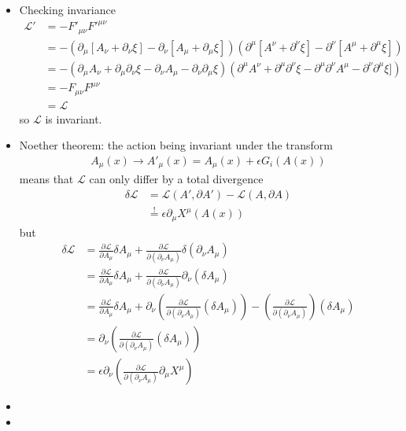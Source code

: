 \documentclass[../main.tex]{subfiles}
\begin{document}
\begin{itemize}
\item Checking invariance
\begin{align}
\mathcal{L}'&=-F'_{\mu\nu}F'^{\mu\nu}\\
&=-(\partial_\mu[A_\nu+\partial_\nu\xi]-\partial_\nu[A_\mu+\partial_\mu\xi])(\partial^\mu[A^\nu+\partial^\nu\xi]-\partial^\nu[A^\mu+\partial^\mu\xi])\\
&=-(\partial_\mu A_\nu+\partial_\mu\partial_\nu\xi-\partial_\nu A_\mu-\partial_\nu\partial_\mu\xi)
(\partial^\mu A^\nu+\partial^\mu\partial^\nu\xi-\partial^\mu\partial^\nu A^\mu-\partial^\nu\partial^\mu\xi])\\
&=-F_{\mu\nu}F^{\mu\nu}\\
&=\mathcal{L}
\end{align}
so $\mathcal{L}$ is invariant.
\item Noether theorem: the action being invariant under the transform
\begin{align}
A_\mu(x)\rightarrow A'_\mu(x)=A_\mu(x)+\epsilon G_i(A(x))
\end{align}
means that $\mathcal{L}$ can only differ by a total divergence
\begin{align}
\delta\mathcal{L}
&=\mathcal{L}(A',\partial A')-\mathcal{L}(A,\partial A)\\
&\overset{!}{=}\epsilon\partial_\mu X^\mu(A(x))
\end{align}
but
\begin{align}
\delta\mathcal{L}
&=\frac{\partial\mathcal{L}}{\partial A_\mu}\delta A_\mu+\frac{\partial\mathcal{L}}{\partial (\partial_\nu A_\mu)}\delta (\partial_\nu A_\mu)\\
&=\frac{\partial\mathcal{L}}{\partial A_\mu}\delta A_\mu+\frac{\partial\mathcal{L}}{\partial (\partial_\nu A_\mu)} \partial_\nu (\delta A_\mu)\\
&=\frac{\partial\mathcal{L}}{\partial A_\mu}\delta A_\mu+\partial_\nu
\left(\frac{\partial\mathcal{L}}{\partial (\partial_\nu A_\mu)}  (\delta A_\mu)\right)-\left(\frac{\partial\mathcal{L}}{\partial (\partial_\nu A_\mu)}\right)  (\delta A_\mu)\\
&=\partial_\nu\left(\frac{\partial\mathcal{L}}{\partial (\partial_\nu A_\mu)}  (\delta A_\mu)\right)\\
&=\epsilon\partial_\nu\left(\frac{\partial\mathcal{L}}{\partial (\partial_\nu A_\mu)}\partial_\mu X^\mu\right)
\end{align}
\item
\item
\end{itemize}
\end{document}
